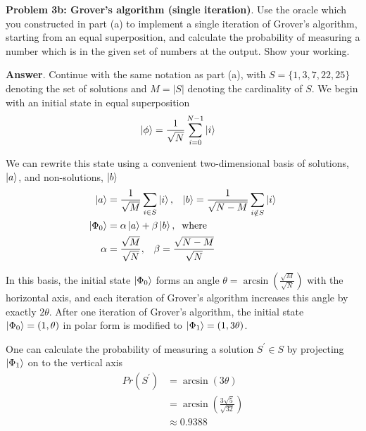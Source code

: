 \textbf{Problem 3b: Grover's algorithm (single iteration)}. Use the oracle which you constructed in part (a) to implement a single iteration of Grover's algorithm, starting from an equal superposition, and calculate the probability of measuring a number which is in the given set of numbers at the output. 
Show your working.


\textbf{Answer}. Continue with the same notation as part (a), with $S = \{1, 3, 7, 22, 25\}$ denoting the set of solutions and
$M=|S|$ denoting the cardinality of $S$.
We begin with an initial state in equal superposition
\begin{align*}
\ket{\phi} &= \frac{1}{\sqrt{N}}\sum_{i=0}^{N-1}\ket{i}
\end{align*}

We can rewrite this state using a convenient two-dimensional basis of solutions, $\ket{a}$, and non-solutions, $\ket{b}$
\begin{align*}
	\ket{a} &= \frac{1}{\sqrt{M}}\sum_{i \in S}\ket{i},\;\;\; \ket{b} = \frac{1}{\sqrt{N-M}}\sum_{i \notin S}\ket{i} \\
	\ket{\Phi_0} &= \alpha \ket{a} + \beta \ket{b},\;\; \text{where} \\ 
	\alpha &= \frac{\sqrt{M}}{\sqrt{N}}, \;\;\; \beta = \frac{\sqrt{N-M}}{\sqrt{N}}
\end{align*}

In this basis, the initial state $\ket{\Phi_0}$ forms an angle $\theta = \arcsin (\frac{\sqrt{M}}{\sqrt{N}})$ with the horizontal axis, and each iteration of Grover's algorithm increases this angle by exactly $2\theta$.
After one iteration of Grover's algorithm, the initial state $\ket{\Phi_0} = (1, \theta)$ in polar form is modified to $\ket{\Phi_1} = (1, 3\theta)$.

One can calculate the probability of measuring a solution $S^\prime \in S$ by projecting $\ket{\Phi_1}$ on to the vertical axis
\begin{align*}
	Pr(S^\prime) &= \arcsin(3\theta) \\
	&= \arcsin(\frac{3\sqrt{5}}{\sqrt{32}}) \\
	&\approx 0.9388
\end{align*}


